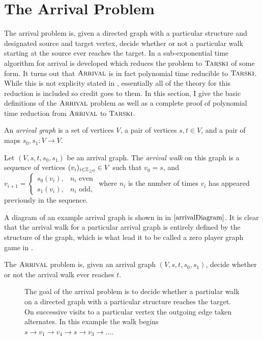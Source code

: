 \section{The Arrival Problem}
\newcommand{\flowin}{\ensuremath{f_{\text{in}}}}
\newcommand{\glowin}{\ensuremath{g_{\text{in}}}}

The arrival problem is, given a directed graph with
a particular structure and designated source and target vertex,
decide whether or not a particular walk starting at the source
ever reaches the target. In \citep{gärtner2021subexponential} a sub-exponential
time algorithm for arrival is developed which reduces the problem to $\textsc{Tarski}$ of some form.
It turns out that $\textsc{Arrival}$ is in fact polynomial time reducible to $\textsc{Tarski}$.
While this is not explicity stated in \citep{gärtner2021subexponential}, essentially
all of the theory for this reduction is included so credit goes to them. In this section,
I give the basic definitions of the $\textsc{Arrival}$ problem as well as a complete proof
of polynomial time reduction from $\textsc{Arrival}$ to $\textsc{Tarski}$.
\begin{definition}
  An \emph{arrival graph} is a set of vertices $V$, a pair of
  vertices $s, t \in V$, and a pair of maps 
  $s_0, s_1 : V \to V$. 
\end{definition}
\begin{definition}
  Let $(V, s, t, s_0, s_1)$ be an arrival graph. The \emph{arrival walk}
  on this graph is a sequence of vertices $(v_i)_{i \in \mathbb{Z}_{\geq 0}} \in V$
  such that $v_0 = s$, and $v_{i+1} = 
  \begin{cases} 
    s_0(v_i), & \text{$n_i$ even}\\  
    s_1(v_i), & \text{$n_i$ odd},
  \end{cases}$
  where $n_i$ is the number of times $v_i$ has appeared previously in
  the sequence.
\end{definition}
 A diagram of an example arrival graph is shown in 
in $\cref{arrivalDiagram}$.
It is clear that the arrival walk for a particular arrival graph
is entirely defined by the structure of the graph, which is what
lead it to be called a zero player graph game in \citep{arrivalBasic}.
\begin{definition}
  The $\textsc{Arrival}$ problem is, given an arrival graph $(V, s, t, s_0, s_1)$,
  decide whether or not the arrival walk ever reaches $t$.
\end{definition}
\begin{figure}[h]
  \centering
  
  \caption{The goal of the arrival problem is to decide whether a partiular walk on a directed graph with a particular
  structure reaches the target. On successive visits to a particular
  vertex the outgoing edge taken alternates. In this example
  the walk begins $s \to v_1 \to v_4 \to s \to v_3 \to \ldots$.} \label{arrivalDiagram}
\end{figure}
